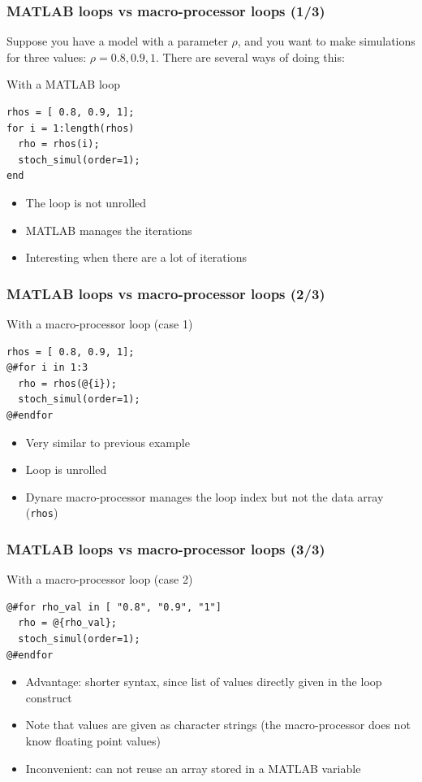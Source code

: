\documentclass{beamer}
\begin{document}
\begin{frame}[fragile=singleslide]
  \frametitle{MATLAB loops vs macro-processor loops (1/3)}
  Suppose you have a model with a parameter $\rho$, and you want to make
  simulations for three values: $\rho = 0.8, 0.9, 1$. There are
  several ways of doing this:
  \begin{block}{With a MATLAB loop}
\begin{verbatim}
rhos = [ 0.8, 0.9, 1];
for i = 1:length(rhos)
  rho = rhos(i);
  stoch_simul(order=1);
end
\end{verbatim}
  \end{block}
  \begin{itemize}
  \item The loop is not unrolled
  \item MATLAB manages the iterations
  \item Interesting when there are a lot of iterations
  \end{itemize}
\end{frame}

\begin{frame}[fragile=singleslide]
  \frametitle{MATLAB loops vs macro-processor loops (2/3)}
  \begin{block}{With a macro-processor loop (case 1)}
\begin{verbatim}
rhos = [ 0.8, 0.9, 1];
@#for i in 1:3
  rho = rhos(@{i});
  stoch_simul(order=1);
@#endfor
\end{verbatim}
  \end{block}
  \begin{itemize}
  \item Very similar to previous example
  \item Loop is unrolled
  \item Dynare macro-processor manages the loop index but not the data array (\texttt{rhos})
  \end{itemize}
\end{frame}

\begin{frame}[fragile=singleslide]
  \frametitle{MATLAB loops vs macro-processor loops (3/3)}
  \begin{block}{With a macro-processor loop (case 2)}
\begin{verbatim}
@#for rho_val in [ "0.8", "0.9", "1"]
  rho = @{rho_val};
  stoch_simul(order=1);
@#endfor
\end{verbatim}
  \end{block}
  \begin{itemize}
  \item Advantage: shorter syntax, since list of values directly given in the loop construct
  \item Note that values are given as character strings (the macro-processor does not
    know floating point values)
  \item Inconvenient: can not reuse an array stored in a MATLAB variable
  \end{itemize}
\end{frame}
\end{document}
